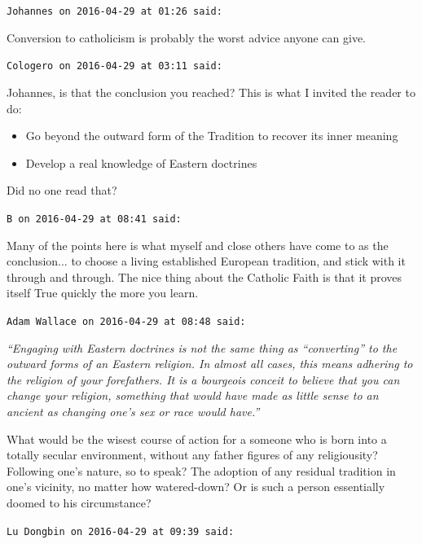 \begin{footnotesize}
\begin{sffamily}
\texttt{Johannes on 2016-04-29 at 01:26 said:}

Conversion to catholicism is probably the worst advice anyone can give.

\hfill

\texttt{Cologero on 2016-04-29 at 03:11 said:}

Johannes, is that the conclusion you reached? This is what I invited the reader to do:

\begin{itemize}


\item Go beyond the outward form of the Tradition to recover its inner meaning

\item Develop a real knowledge of Eastern doctrines
\end{itemize}


Did no one read that?

\hfill

\texttt{B on 2016-04-29 at 08:41 said:}

Many of the points here is what myself and close others have come to as the conclusion... to choose a living established European tradition, and stick with it through and through. The nice thing about the Catholic Faith is that it proves itself True quickly the more you learn.

\hfill

\texttt{Adam Wallace on 2016-04-29 at 08:48 said:}

\emph{``Engaging with Eastern doctrines is not the same thing as ``converting'' to the outward forms of an Eastern religion. In almost all cases, this means adhering to the religion of your forefathers. It is a bourgeois conceit to believe that you can change your religion, something that would have made as little sense to an ancient as changing one's sex or race would have.''}

What would be the wisest course of action for a someone who is born into a totally secular environment, without any father figures of any religiousity? Following one's nature, so to speak? The adoption of any residual tradition in one's vicinity, no matter how watered-down? Or is such a person essentially doomed to his circumstance?

\hfill

\texttt{Lu Dongbin on 2016-04-29 at 09:39 said:}


\end{sffamily}
\end{footnotesize}
